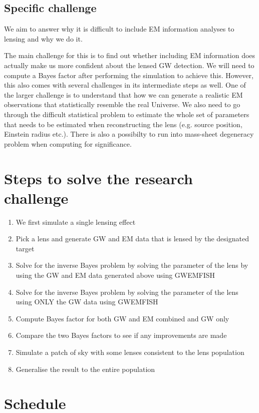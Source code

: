 \documentclass[pdflatex,sn-mathphys-num]{sn-jnl}%
\theoremstyle{thmstyleone}%
\theoremstyle{thmstyletwo}%
\theoremstyle{thmstylethree}%
\begin{document}
\subsection{Specific challenge}
We aim to answer why it is difficult to include EM information analyses to lensing and why we do it.

The main challenge for this is to find out whether including EM information does actually make us more confident about the lensed GW detection. We will need to compute a Bayes factor after performing the simulation to achieve this. However, this also comes with several challenges in its intermediate steps as well. One of the larger challenge is to understand that how we can generate a realistic EM observations that statistically resemble the real Universe. We also need to go through the difficult statistical problem to estimate the whole set of parameters that needs to be estimated when reconstructing the lens (e.g. source position, Einstein radius etc.). There is also a possibilty to run into mass-sheet degeneracy problem when computing for significance.

\section{Steps to solve the research challenge}
\begin{enumerate}
	\item We first simulate a single lensing effect
	\item Pick a lens and generate GW and EM data that is lensed by the designated target
	\item Solve for the inverse Bayes problem by solving the parameter of the lens by using the GW and EM data generated above using GWEMFISH
	\item Solve for the inverse Bayes problem by solving the parameter of the lens using ONLY the GW data using GWEMFISH
	\item Compute Bayes factor for both GW and EM combined and GW only
	\item Compare the two Bayes factors to see if any improvements are made
	\item Simulate a patch of sky with some lenses consistent to the lens population
	\item Generalise the result to the entire population
\end{enumerate}


\section{Schedule}
\end{document}
